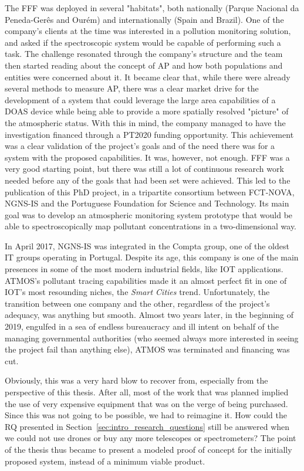 The \gls{FFF} was deployed in several "habitats", both nationally
(Parque Nacional da Peneda-Gerês and Ourém) and internationally (Spain
and Brazil). One of the company's clients at the time was interested in
a pollution monitoring solution, and asked if the spectroscopic system
would be capable of performing such a task. The challenge resonated
through the company's structure and the team then started reading about
the concept of \gls{AP} and how both populations and entities were
concerned about it. It became clear that, while there were already
several methods to measure \gls{AP}, there was a clear market drive for
the development of a system that could leverage the large area
capabilities of a \gls{DOAS} device while being able to provide a more
spatially resolved "picture" of the atmospheric status. With this in
mind, the company managed to have the investigation financed through a
\gls{PT2020} funding opportunity. This achievement was a clear
validation of the project's goals and of the need there was for a system
with the proposed capabilities. It was, however, not enough. \gls{FFF}
was a very good starting point, but there was still a lot of continuous
research work needed before any of the goals that had been set were
achieved. This led to the publication of this PhD project, in a
tripartite consortium between FCT-NOVA, NGNS-IS and the Portuguese
Foundation for Science and Technology. Its main goal was to develop an
atmospheric monitoring system prototype that would be able to
spectroscopically map pollutant concentrations in a two-dimensional way.

In April 2017, NGNS-IS was integrated in the Compta group, one of the
oldest IT groups operating in Portugal. Despite its age, this company is
one of the main presences in some of the most modern industrial fields,
like \gls{IOT} applications. \gls{ATMOS}'s pollutant tracing
capabilities made it an almost perfect fit in one of \gls{IOT}'s most
resounding niches, the \emph{Smart Cities} trend. Unfortunately, the
transition between one company and the other, regardless of the
project's adequacy, was anything but smooth. Almost two years later, in
the beginning of 2019, engulfed in a sea of endless bureaucracy and ill
intent on behalf of the managing governmental authorities (who seemed
always more interested in seeing the project fail than anything else),
\gls{ATMOS} was terminated and financing was cut.

Obviously, this was a very hard blow to recover from, especially from
the perspective of this thesis. After all, most of the work that was
planned implied the use of very expensive equipment that was on the
verge of being purchased. Since this was not going to be possible, we
had to reimagine it. How could the \gls{RQ} presented in
Section~\ref{sec:intro_research_questions} still be answered when we
could not use drones or buy any more telescopes or spectrometers? The
point of the thesis thus became to present a modeled proof of concept
for the initially proposed system, instead of a minimum viable product.
